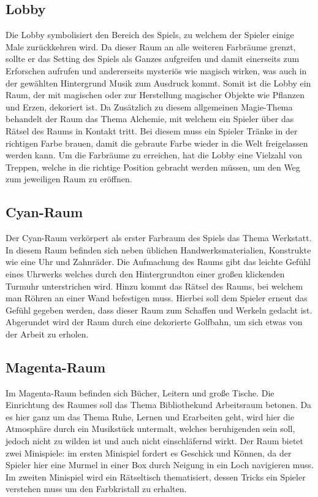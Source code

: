 \subsection{Lobby}
Die Lobby symbolisiert den Bereich des Spiels, zu welchem der Spieler einige Male zurückkehren wird. Da dieser Raum an alle weiteren Farbräume grenzt, sollte er das Setting des Spiels als Ganzes aufgreifen und damit einerseits zum Erforschen aufrufen und andererseits mysteriös wie magisch wirken, was auch in der gewählten Hintergrund Musik zum Ausdruck kommt. Somit ist die Lobby ein Raum, der mit magischen oder zur Herstellung magischer Objekte wie Pflanzen und Erzen, dekoriert ist. Da Zusätzlich zu diesem allgemeinen Magie-Thema behandelt der Raum das Thema Alchemie, mit welchem ein Spieler über das Rätsel des Raums in Kontakt tritt. Bei diesem muss ein Spieler Tränke in der richtigen Farbe brauen, damit die gebraute Farbe wieder in die Welt freigelassen werden kann. Um die Farbräume zu erreichen, hat die Lobby eine Vielzahl von Treppen, welche in die richtige Position gebracht werden müssen, um den Weg zum jeweiligen Raum zu eröffnen.

\subsection{Cyan-Raum}
Der Cyan-Raum verkörpert als erster Farbraum des Spiels das Thema \dq Werkstatt\dq. In diesem Raum befinden sich neben üblichen Handwerksmaterialien, Konstrukte wie eine Uhr und Zahnräder. Die Aufmachung des Raums gibt das leichte Gefühl eines Uhrwerks welches durch den Hintergrundton einer großen klickenden Turmuhr unterstrichen wird. Hinzu kommt das Rätsel des Raums, bei welchem man Röhren an einer Wand befestigen muss. Hierbei soll dem Spieler erneut das Gefühl gegeben werden, dass dieser Raum zum Schaffen und Werkeln gedacht ist. Abgerundet wird der Raum durch eine dekorierte Golfbahn, um sich etwas von der Arbeit zu erholen.

\subsection{Magenta-Raum}
Im Magenta-Raum befinden sich Bücher, Leitern und große Tische. Die Einrichtung des Raumes soll das Thema \dq Bibliothek\dq und Arbeitsraum betonen. Da es hier ganz um das Thema Ruhe, Lernen und Erarbeiten geht, wird hier die Atmosphäre durch ein Musikstück untermalt, welches beruhigenden sein soll, jedoch nicht zu wilden ist und auch nicht einschläfernd wirkt. Der Raum bietet zwei Minispiele: im ersten Minispiel fordert es Geschick und Können, da der Spieler hier eine Murmel in einer Box durch Neigung in ein Loch navigieren muss. Im zweiten Minispiel wird ein Rätseltisch thematisiert, dessen Tricks ein  Spieler verstehen muss um den Farbkristall zu erhalten.


